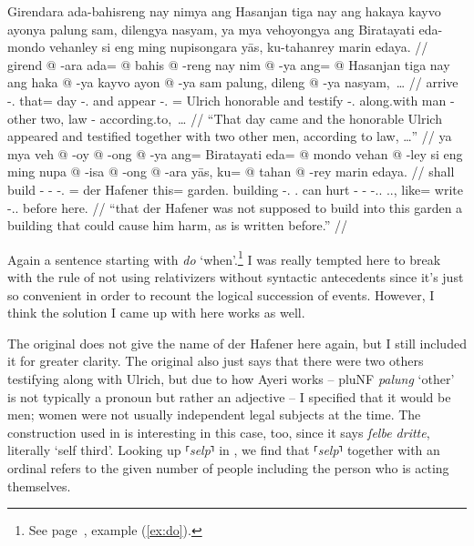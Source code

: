 \documentclass[12pt,paper=a4]{scrartcl}
\newcommand{\fw}[1]{\textit{#1}} %
\newcommand{\norm}[1]{⸢\textit{#1}⸣} %
\newcommand{\xayr}[3]{{\Tagati #1} \emph{#2} \enquote*{#3}}
\begin{document}
\pex
	\glpreamble Girendara ada-bahisreng nay nimya ang Hasanjan tiga nay ang 
		hakaya kayvo ayonya palung sam, dilengya nasyam, ya mya 
		vehoyongya ang Biratayati eda-mondo vehanley si eng ming 
		nupisongara yās, ku-tahanrey marin edaya. //
	\a \begingl
		\gla girend @ -ara ada= @ bahis @ -reng nay nim @ -ya ang= @ 
			Hasanjan tiga nay ang haka @ -ya kayvo ayon @ -ya sam 
			palung, dileng @ -ya nasyam,~… //
		\glb arrive -\Tsg{}.\Inan{} that= day -\Aarg{}.\Inan{} and 
			appear -\Tsg{}.\M{} \Aarg{}= Ulrich honorable and 
			\AgtT{} testify -\Tsg{}.\M{} along.with man -\Loc{} 
			other two, law -\Loc{} according.to,~… //
		\glft \enquote{That day came and the honorable Ulrich appeared 
			and testified together with two other men, according to 
			law, …} //
	\endgl
	\a \begingl
		\gla ya mya veh @ -oy @ -ong @ -ya ang= Biratayati eda= @ mondo 
			vehan @ -ley si eng ming nupa @ -isa @ -ong @ -ara yās, 
			ku= @ tahan @ -rey marin edaya. //
		\glb \LocT{} shall build -\Neg{} -\Irr{} -\Tsg{}.\M{} \Aarg{}= 
			{der Hafener} this= garden.\Top{} building 
			-\Parg{}.\Inan{} \Rel{} \AgtT{}.\Inan{} can hurt 
			-\Caus{} -\Irr{} -\Tsg{}.\Inan{}.\Top{} 
			\Tsg{}.\M{}.\Parg{}, like= write -\Tsg{}.\Inan{}.\Parg{} 
			before here. //
		\glft \enquote{that {der Hafener} was not supposed to build into 
			this garden a building that could cause him harm, as is 
			written before.} //
	\endgl
\xe

Again a sentence starting with \fw{do} `when'.\footnote{See page~\pageref{ex:do},
example (\ref{ex:do}).} I was really tempted here to break with the rule of not 
using relativizers without syntactic antecedents since it's just so convenient 
in order to recount the logical succession of events. However, I think the 
solution I came up with here works as well.

The \Mhg{} original does not give the name of der Hafener here again, but I 
still included it for greater clarity. The original also just says that there 
were two others testifying along with Ulrich, but due to how Ayeri works -- 
\xayr{pluNF}{palung}{other} is not typically a pronoun but rather an adjective
-- I specified that it would be men; women were not usually independent legal 
subjects at the time. The construction used in \Mhg{} is interesting in this 
case, too, since it says \fw{ſelbe dritte}, literally `self third'. Looking up 
\norm{selp} in \textcite{lexer}, we find that \norm{selp} together with an 
ordinal refers to the given number of people including the person who is acting 
themselves.
\end{document}
